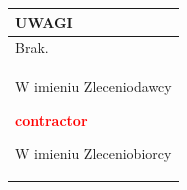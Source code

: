 \documentclass{article}
\newcommand{\rowspace}{
    \begin{minipage}[c][2em][t]{0pt}\end{minipage}
}
\newcommand{\VAR}[1]{
    \textbf{\textcolor{red}{#1}}
}
\begin{document}
    \newpage

    \begin{tabularx}{\textwidth}{|X|}
        \hline
        \cellcolor[gray]{0.8}\rowspace \centerline{UWAGI} \\
        \hline
        \rowspace Brak. \\
        \hline
        \vspace{6em}
        \begin{minipage}{0.49\textwidth}\centering \phantom{X} \par \dotfill \par W imieniu Zleceniodawcy \end{minipage}
        \begin{minipage}{0.49\textwidth}\centering \VAR{contractor} \par \dotfill \par W imieniu Zleceniobiorcy \end{minipage} \par \\
        \hline
    \end{tabularx}
\end{document}
